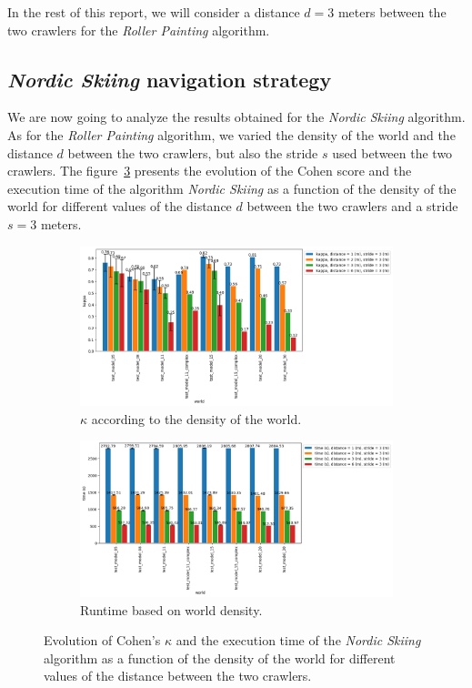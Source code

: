 In the rest of this report, we will consider a distance $d = 3$ meters between the two crawlers for the \textit{Roller Painting} algorithm.

\subsection*{\textit{Nordic Skiing} navigation strategy}

We are now going to analyze the results obtained for the \textit{Nordic Skiing} algorithm.
As for the \textit{Roller Painting} algorithm, we varied the density of the world and the distance $d$ between the two crawlers, but also the stride $s$ used between the two crawlers.
The figure~\ref{fig:ski_nordique-world_d} presents the evolution of the Cohen score and the execution time of the algorithm \textit{Nordic Skiing} as a function of the density of the world for different values of the distance $d$ between the two crawlers and a stride $s = 3$ meters.

\begin{figure}[h!]
	\centering
	\begin{subfigure}[t]{0.9\linewidth}
		\includegraphics[width=\linewidth]{graphics/ski_nordique-kappa_vs_world_for_each_d.png}
		\caption{$\kappa$ according to the density of the world.}
		\label{fig:ski_nordique-kappa_vs_world_d}
	\end{subfigure}
	\hfill
	\begin{subfigure}[t]{0.9\linewidth}
		\includegraphics[width=\linewidth]{graphics/ski_nordique-time_vs_world_for_each_d.png}
		\caption{Runtime based on world density.}
		\label{fig:ski_nordique-time_vs_world_d}
	\end{subfigure}
	\caption{Evolution of Cohen's $\kappa$ and the execution time of the \textit{Nordic Skiing} algorithm as a function of the density of the world for different values of the distance between the two crawlers.}
	\label{fig:ski_nordique-world_d}
\end{figure}

